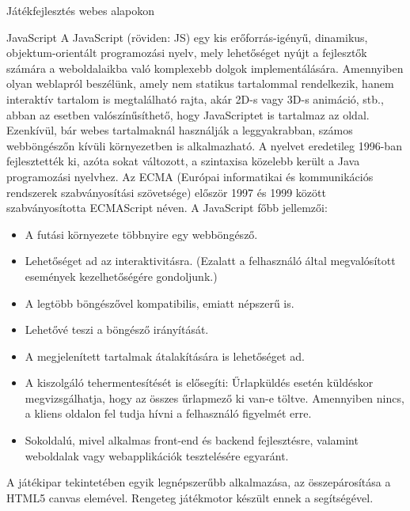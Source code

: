 \begin{MyChapter}{Játékfejlesztés webes alapokon}
	\begin{MySection}{JavaScript}
		A JavaScript (röviden: JS) egy kis erőforrás-igényű, dinamikus, objektum-orientált programozási nyelv, mely lehetőséget nyújt a fejlesztők számára a weboldalaikba való komplexebb dolgok implementálására. Amennyiben olyan weblapról beszélünk, amely nem statikus tartalommal rendelkezik, hanem interaktív tartalom is megtalálható rajta, akár 2D-s vagy 3D-s animáció, stb., abban az esetben valószínűsíthető, hogy JavaScriptet is tartalmaz az oldal. Ezenkívül, bár webes tartalmaknál használják a leggyakrabban, számos webböngészőn kívüli környezetben is alkalmazható. A nyelvet eredetileg 1996-ban fejlesztették ki, azóta sokat változott, a szintaxisa közelebb került a Java programozási nyelvhez. Az ECMA (Európai informatikai és kommunikációs rendszerek szabványosítási szövetsége) először 1997 és 1999 között szabványosította ECMAScript néven.
		\newline \newline
		A JavaScript főbb jellemzői:
		
		\begin{itemize}
			\item A futási környezete többnyire egy webböngésző.
			\item Lehetőséget ad az interaktivitásra. (Ezalatt a felhasználó által megvalósított események kezelhetőségére gondoljunk.)
			\item A legtöbb böngészővel kompatibilis, emiatt népszerű is.
			\item Lehetővé teszi a böngésző irányítását.
			\item A megjelenített tartalmak átalakítására is lehetőséget ad.
			\item A kiszolgáló tehermentesítését is elősegíti: Űrlapküldés esetén küldéskor megvizsgálhatja, hogy az összes űrlapmező ki van-e töltve. Amennyiben nincs, a kliens oldalon fel tudja hívni a felhasználó figyelmét erre.
			\item Sokoldalú, mivel alkalmas front-end és backend fejlesztésre, valamint weboldalak vagy webapplikációk tesztelésére egyaránt.
		\end{itemize}
		A játékipar tekintetében egyik legnépszerűbb alkalmazása, az összepárosítása a HTML5 canvas elemével. Rengeteg játékmotor készült ennek a segítségével.
		

\end{MySection}
\end{MyChapter}
